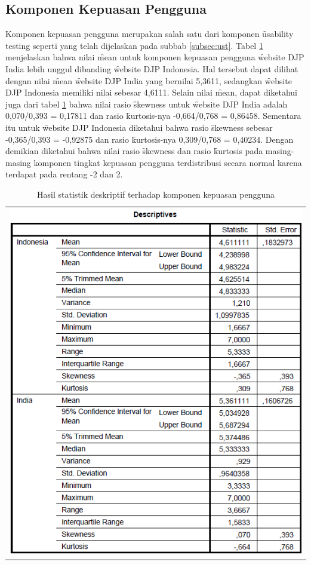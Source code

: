 \subsection{Komponen Kepuasan Pengguna}
Komponen kepuasan pengguna merupakan salah satu dari komponen \f{usability testing} seperti yang telah dijelaskan pada subbab \ref{subsec:ust}. 
Tabel \ref{tab:descsat} menjelaskan bahwa nilai \f{mean} untuk komponen kepuasan pengguna \f{website} DJP India lebih unggul dibanding \f{website} DJP Indonesia. Hal tersebut dapat dilihat dengan nilai \f{mean} \f{website} DJP India yang bernilai 5,3611, sedangkan \f{website} DJP Indonesia memiliki nilai sebesar 4,6111. Selain nilai \f{mean}, dapat diketahui juga dari tabel \ref{tab:descsat} bahwa nilai rasio \f{skewness} untuk \f{website} DJP India adalah 0,070/0,393 = 0,17811 dan rasio \f{kurtosis}-nya -0,664/0,768 = 0,86458. Sementara itu untuk \f{website} DJP Indonesia diketahui bahwa rasio \f{skewness} sebesar -0,365/0,393 = -0,92875 dan rasio \f{kurtosis}-nya 0,309/0,768 = 0,40234. Dengan demikian diketahui bahwa nilai rasio \f{skewness} dan rasio \f{kurtosis} pada masing-masing komponen tingkat kepuasan pengguna terdistribusi secara normal karena terdapat pada rentang -2 dan 2. 
\begin{table}
	\centering
	\caption{Hasil statistik deskriptif terhadap komponen kepuasan pengguna}
	\label{tab:descsat}
	\begin{tabular}{c}
		\includegraphics[width=\textwidth]
		{pics/ordinaldescSAT.PNG}
	\end{tabular}
\end{table}
